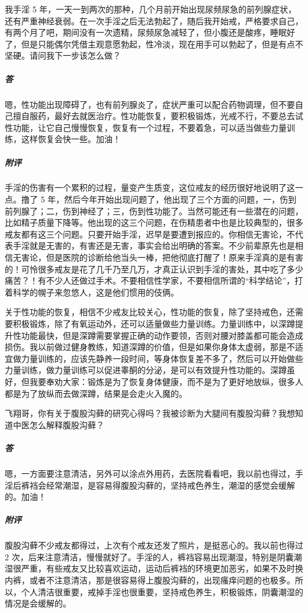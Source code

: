 \begin{case}
    我手淫 5 年，一天一到两次的那种，几个月前开始出现尿频尿急的前列腺症状，还有严重神经衰弱。在一次手淫之后无法勃起了，随后我开始戒，严格要求自己，有两个月了吧，期间没有一次遗精，尿频尿急减轻了，但小腹还是酸疼，睡眠好了，但是只能偶尔凭借主观意愿勃起，性冷淡，现在用手可以勃起了，但是有点不坚硬。请问我下一步该怎么做？
    \subparagraph{答} 嗯，性功能出现障碍了，也有前列腺炎了，症状严重可以配合药物调理，但不要自己擅自服药，最好去就医治疗。性功能恢复，要积极锻炼，光戒不行，不要总去试性功能，让它自己慢慢恢复，恢复有一个过程，不要着急，可以适当做些力量训练，这样恢复会快一些。加油！
    \subparagraph{附评} 手淫的伤害有一个累积的过程，量变产生质变，这位戒友的经历很好地说明了这一点。撸了 5 年，然后今年开始出现问题了，他出现了三个方面的问题，一，伤到前列腺了；二，伤到神经了；三，伤到性功能了。当然可能还有一些潜在的问题，比如精子质量下降等。他出现的这三个问题，在伤精患者中也是比较典型的，很多戒友都有这三个问题。只要开始手淫，迟早是要遭到报应的。你相信无害论，不代表手淫就是无害的，有害还是无害，事实会给出明确的答案。不少前辈原先也是相信无害论，但是医院的诊断给他当头一棒，把他彻底打醒了！原来手淫真的是有害的！可怜很多戒友是花了几千乃至几万，才真正认识到手淫的害处，其中吃了多少痛苦？！有不少人还做过手术。不要相信性学家，不要相信所谓的“科学结论”，打着科学的幌子来忽悠人，这是他们惯用的伎俩。

    关于性功能的恢复，相信不少戒友比较关心，性功能的恢复，除了坚持戒色，还需要积极锻炼，除了有氧运动外，还可以适量做些力量训练。力量训练中，以深蹲提升性功能最快，但是深蹲需要掌握正确的动作要领，否则对腰对膝盖都可能会造成损伤。我以前做过健身教练，知道深蹲的价值，但是如果你身体太虚弱，那是不适宜做力量训练的，应该先静养一段时间，等身体恢复差不多了，然后可以开始做些力量训练，做力量训练可以促进睾酮的分泌，是可以有效提升性功能的。深蹲虽好，但我要奉劝大家：锻炼是为了恢复身体健康，而不是为了更好地放纵，很多人都是为了放纵而去做深蹲，结果是会走火入魔的。
\end{case}

\begin{case}
    飞翔哥，你有关于腹股沟藓的研究心得吗？我被诊断为大腿间有腹股沟藓？我想知道中医怎么解释腹股沟藓？
    \subparagraph{答} 嗯，一方面要注意清洁，另外可以涂点外用药，去医院看看吧，我以前也得过，手淫后裤裆会经常潮湿，是容易得腹股沟藓的，坚持戒色养生，潮湿的感觉会缓解的。加油！
    \subparagraph{附评} 腹股沟藓不少戒友都得过，上次有个戒友还发了照片，是挺恶心的。我以前也得过 2 次，后来注意清洁，慢慢就好了。手淫的人，裤裆容易出现潮湿，特别是阴囊潮湿很严重，有些戒友又比较喜欢运动，运动后裤裆的环境更加恶劣，如果不及时换内裤，或者不注意清洁，那是很容易得上腹股沟藓的，出现瘙痒问题的也极多。所以，个人清洁很重要，戒掉手淫也很重要，坚持戒色养生，积极锻炼，阴囊潮湿的情况是会缓解的。
\end{case}

